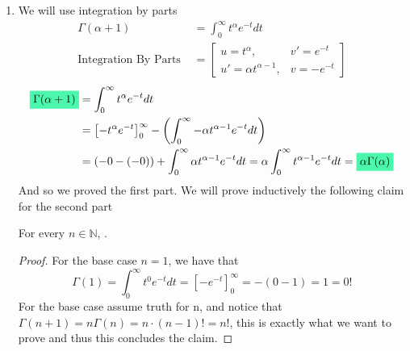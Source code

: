 \documentclass[../main.tex]{subfiles}
\begin{document}
\begin{enumerate}
\item We will use integration by parts
\begin{align*}
    \Gamma(\alpha+1) &= \int_0^{\infty} t^{\alpha}e^{-t} dt \\
    \text{Integration By Parts }&=\begin{bmatrix} u = t^{\alpha}, & v' = e^{-t} \\ u' = \alpha t^{\alpha-1},& v = -e^{-t}\end{bmatrix}
\end{align*}
\begin{align*}
    \mathcolorbox{goodcolor}{\Gamma(\alpha+1)} &=\int_0^{\infty} t^{\alpha}e^{-t} dt \\
    &= \left[-t^{\alpha}e^{-t}\right]_0^{\infty} - \left(\int_0^{\infty} -\alpha t^{\alpha-1}e^{-t}dt\right) \\
    &= (-0-(-0)) + \int_0^{\infty}\alpha t^{\alpha-1}e^{-t} dt= \alpha \int_0^{\infty} t^{\alpha -1}e^{-t} dt = \mathcolorbox{goodcolor}{\alpha\Gamma(\alpha)}
\end{align*}
And so we proved the first part. We will prove inductively the following claim for the second part 
\begin{claim}
For every $n\in\mathbb{N}$, .
\end{claim}
\begin{proof}
For the base case $n=1$, we have that
\[\Gamma(1)=\int_0^\infty t^0 e^{-t} dt = \left[-e^{-t}\right]_0^{\infty} = -(0-1)=1=0!\]
For the base case assume truth for n, and notice that $\Gamma(n+1) = n\Gamma(n) = n\cdot (n-1)! = n!$, this is exactly what we want to prove and thus this concludes the claim.
\end{proof}
\qedsymbol


\end{enumerate}
\end{document}

